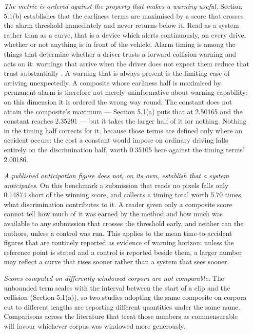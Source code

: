 \emph{The metric is ordered against the property that makes a warning useful.}
Section 5.1(b) establishes that the earliness terms are maximised by a score
that crosses the alarm threshold immediately and never returns below it. Read
as a system rather than as a curve, that is a device which alerts continuously,
on every drive, whether or not anything is in front of the vehicle. Alarm timing
is among the things that determine whether a driver trusts a forward collision
warning and acts on it: warnings that arrive when the driver does not expect
them reduce that trust substantially \citep{abe2006alarm}. A warning that is
always present is the limiting case of arriving unexpectedly. A
composite whose earliness half is maximised by permanent alarm is therefore
not merely uninformative about warning capability; on this dimension it is
ordered the wrong way round. The constant does not attain the composite's
maximum --- Section 5.1(a) puts that at 2.50165 and the constant reaches
2.35291 --- but it takes the larger half of it for nothing. Nothing in the timing half corrects for it, because those
terms are defined only where an accident occurs: the cost a constant would
impose on ordinary driving falls entirely on the discrimination half, worth
0.35105 here against the timing terms' 2.00186.

\emph{A published anticipation figure does not, on its own, establish that a
system anticipates.} On this benchmark a submission that reads no pixels
falls only 0.14874 short of the winning score, and collects a timing total
worth 5.70 times what discrimination contributes to it. A reader given only a composite score
cannot tell how much of it was earned by the method and how much was available
to any submission that crosses the threshold early, and neither can the
authors, unless a control was run. This applies to the mean time-to-accident
figures that are routinely reported as evidence of warning horizon: unless the
reference point is stated and a control is reported beside them, a larger
number may reflect a curve that rises sooner rather than a system that sees
sooner.

\emph{Scores computed on differently windowed corpora are not comparable.} The
unbounded term scales with the interval between the start of a clip and the
collision (Section 5.1(a)), so two studies adopting the same composite on
corpora cut to different lengths are reporting different quantities under the
same name. Comparisons across the literature that treat those numbers as
commensurable will favour whichever corpus was windowed more generously.

